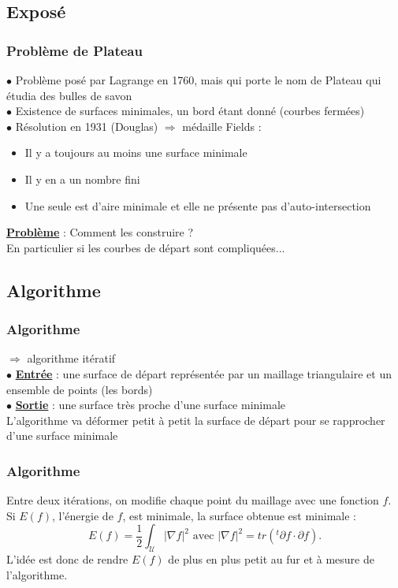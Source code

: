 \documentclass{beamer}
\newcommand{\gs}[1]{\textbf{\underline{#1}}}
\begin{document}
\subsection{Exposé}
\begin{frame}
\frametitle{Problème de Plateau} 
$\bullet$ Problème posé par Lagrange en 1760, mais qui porte le nom de Plateau qui étudia des bulles de savon\\
\pause
$\bullet$ Existence de surfaces minimales, un bord étant donné (courbes fermées)\\
\pause
$\bullet$ Résolution en 1931 (Douglas) $\Rightarrow$ médaille Fields :\\
\pause
\begin{itemize}
\item Il y a toujours au moins une surface minimale\\
\item Il y en a un nombre fini\\
\item Une seule est d'aire minimale et elle ne présente pas d'auto-intersection\\
\end{itemize}
\pause
\gs{Problème} : Comment les construire ?\\
En particulier si les courbes de départ sont compliquées...\\
\end{frame}


\subsection{Algorithme}
\begin{frame}
\frametitle{Algorithme}
$\Longrightarrow$ algorithme itératif\\
$\bullet$ \gs{Entrée} : une surface de départ représentée par un maillage triangulaire et un ensemble de points (les bords)\\
$\bullet$ \gs{Sortie} : une surface très proche d'une surface minimale\\
L'algorithme va déformer petit à petit la surface de départ pour se rapprocher d'une surface minimale
\end{frame}

\begin{frame}
\frametitle{Algorithme}
Entre deux itérations, on modifie chaque point du maillage avec une fonction $f$.\\
Si $E(f)$, l'énergie de $f$, est minimale, la surface obtenue est minimale :
$$E(f) = \frac{1}{2} \int_\mathscr{U} |\nabla f|^2 \text{ avec } |\nabla f|^2 = tr(^t\partial f \cdot \partial f).$$
L'idée est donc de rendre $E(f)$ de plus en plus petit au fur et à mesure de l'algorithme. \\
\end{frame}
\end{document}
